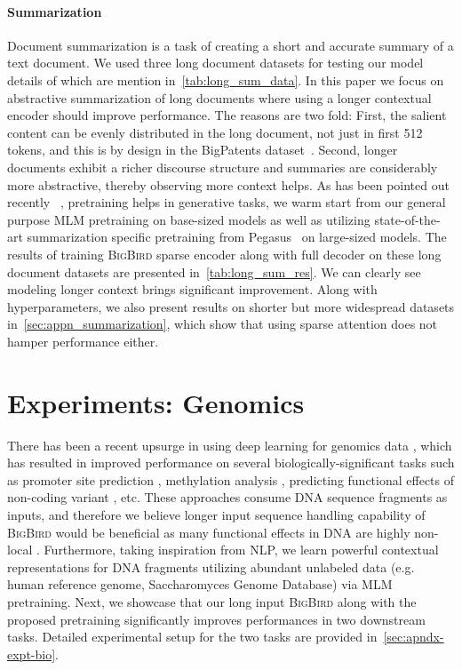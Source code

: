 \paragraph{Summarization}
Document summarization is a task of creating a short and accurate summary of a text document. We used three long document datasets for testing our model details of which are mention in~\ref{tab:long_sum_data}.
In this paper we focus on abstractive summarization of long documents where using a longer contextual encoder should improve performance. The reasons are two fold: First, the salient content can be evenly distributed in the long document, not just in first 512 tokens, and this is by design in the BigPatents dataset~\citep{sharma2019bigpatent}. Second, longer documents exhibit a richer discourse structure and summaries are considerably more abstractive, thereby observing more context helps. As has been pointed out recently ~\citep{rothe2019leveraging,zhang2019pegasus}, pretraining helps in generative tasks, we warm start from our general purpose MLM pretraining on base-sized models as well as utilizing state-of-the-art summarization specific pretraining from Pegasus~\citep{zhang2019pegasus} on large-sized models. The results of training \textsc{BigBird} sparse encoder along with full decoder on these long document datasets are presented in~\ref{tab:long_sum_res}.
We can clearly see modeling longer context brings significant improvement. Along with hyperparameters, we also present results on shorter but more widespread datasets in~\ref{sec:appn_summarization}, which show that using sparse attention does not hamper performance either.

\section{Experiments: Genomics} 
\label{sec:expt-bio}

There has been a recent upsurge in using deep learning for genomics data \citep{tampuu2019viraminer, zhang2019ncnet, busia2019deep}, which has resulted in improved performance on several biologically-significant tasks such as promoter site prediction \citep{oubounyt2019deepromoter}, methylation analysis \citep{levy2020methylnet}, predicting functional effects of non-coding variant \citep{zhou2015predicting}, etc. These approaches consume DNA sequence fragments as inputs, and therefore we believe longer input sequence handling capability of \textsc{BigBird} would be beneficial as many functional effects in DNA are highly non-local \citep{buldyrev1995long}. Furthermore, taking inspiration from NLP, we learn powerful contextual representations for DNA fragments utilizing abundant unlabeled data (e.g. human reference genome, Saccharomyces Genome Database) via MLM pretraining. Next, we showcase that our long input \textsc{BigBird} along with the proposed pretraining significantly improves performances in two downstream tasks. Detailed experimental setup for the two tasks are provided in~\ref{sec:apndx-expt-bio}.

